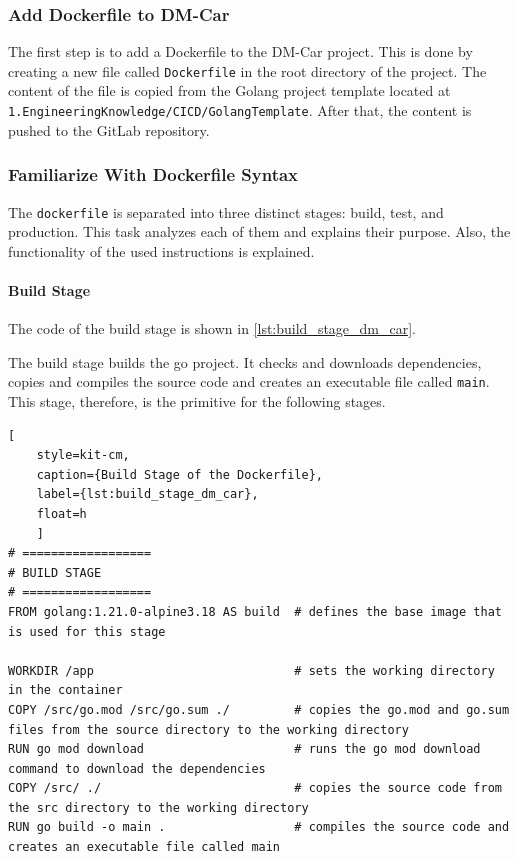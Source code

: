 \subsubsection*{Add Dockerfile to DM-Car}
The first step is to add a Dockerfile to the DM-Car project.
This is done by creating a new file called \texttt{Dockerfile} in the root directory of the project.
The content of the file is copied from the Golang project template located at \texttt{1.EngineeringKnowledge/CICD/GolangTemplate}.
After that, the content is pushed to the GitLab repository.

\subsubsection*{Familiarize With Dockerfile Syntax}
The \texttt{dockerfile} is separated into three distinct stages: build, test, and production.
This task analyzes each of them and explains their purpose.
Also, the functionality of the used instructions is explained.

\paragraph*{Build Stage}
The code of the build stage is shown in \autoref*{lst:build_stage_dm_car}.

The build stage builds the go project.
It checks and downloads dependencies, copies and compiles the source code and creates an executable file called \texttt{main}.
This stage, therefore, is the primitive for the following stages.
 
\begin{lstlisting}[
    style=kit-cm,
    caption={Build Stage of the Dockerfile},
    label={lst:build_stage_dm_car},
    float=h
    ]
# ==================
# BUILD STAGE
# ==================
FROM golang:1.21.0-alpine3.18 AS build  # defines the base image that is used for this stage

WORKDIR /app                            # sets the working directory in the container
COPY /src/go.mod /src/go.sum ./         # copies the go.mod and go.sum files from the source directory to the working directory
RUN go mod download                     # runs the go mod download command to download the dependencies
COPY /src/ ./                           # copies the source code from the src directory to the working directory
RUN go build -o main .                  # compiles the source code and creates an executable file called main
\end{lstlisting}

